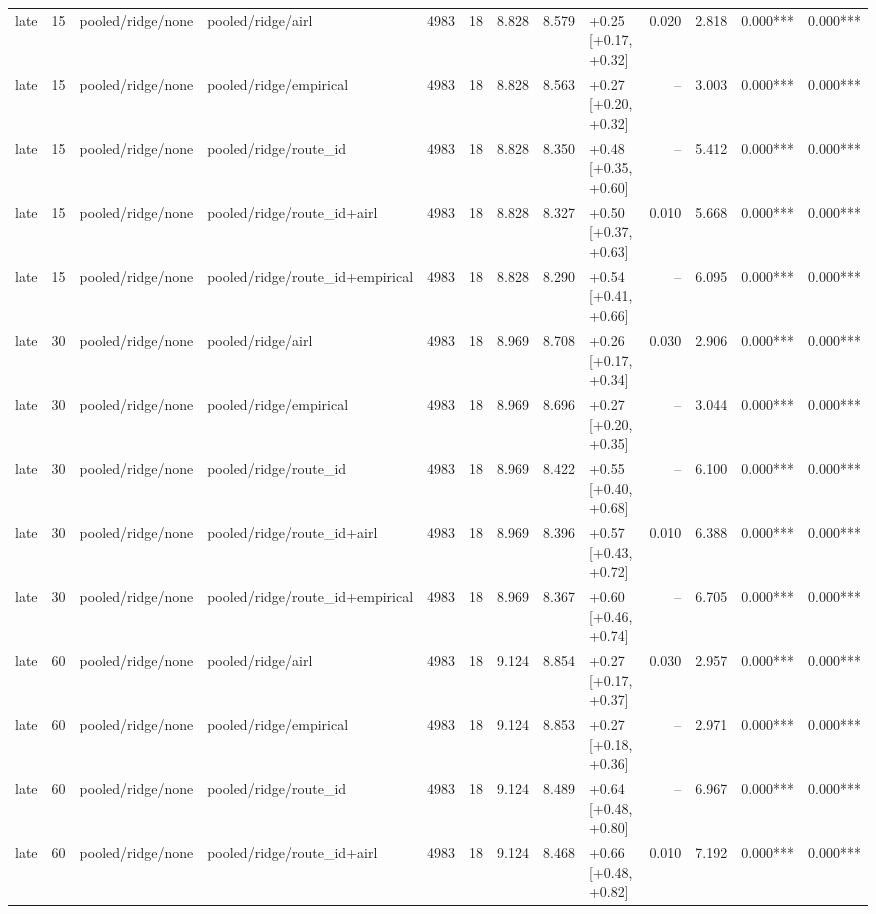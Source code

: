 \begin{tabular}{lrllrrrrlrrll}
late & 15 & pooled/ridge/none & pooled/ridge/airl & 4983 & 18 & 8.828 & 8.579 & +0.25 [+0.17, +0.32] & 0.020 & 2.818 & 0.000*** & 0.000*** \\
late & 15 & pooled/ridge/none & pooled/ridge/empirical & 4983 & 18 & 8.828 & 8.563 & +0.27 [+0.20, +0.32] & -- & 3.003 & 0.000*** & 0.000*** \\
late & 15 & pooled/ridge/none & pooled/ridge/route_id & 4983 & 18 & 8.828 & 8.350 & +0.48 [+0.35, +0.60] & -- & 5.412 & 0.000*** & 0.000*** \\
late & 15 & pooled/ridge/none & pooled/ridge/route_id+airl & 4983 & 18 & 8.828 & 8.327 & +0.50 [+0.37, +0.63] & 0.010 & 5.668 & 0.000*** & 0.000*** \\
late & 15 & pooled/ridge/none & pooled/ridge/route_id+empirical & 4983 & 18 & 8.828 & 8.290 & +0.54 [+0.41, +0.66] & -- & 6.095 & 0.000*** & 0.000*** \\
late & 30 & pooled/ridge/none & pooled/ridge/airl & 4983 & 18 & 8.969 & 8.708 & +0.26 [+0.17, +0.34] & 0.030 & 2.906 & 0.000*** & 0.000*** \\
late & 30 & pooled/ridge/none & pooled/ridge/empirical & 4983 & 18 & 8.969 & 8.696 & +0.27 [+0.20, +0.35] & -- & 3.044 & 0.000*** & 0.000*** \\
late & 30 & pooled/ridge/none & pooled/ridge/route_id & 4983 & 18 & 8.969 & 8.422 & +0.55 [+0.40, +0.68] & -- & 6.100 & 0.000*** & 0.000*** \\
late & 30 & pooled/ridge/none & pooled/ridge/route_id+airl & 4983 & 18 & 8.969 & 8.396 & +0.57 [+0.43, +0.72] & 0.010 & 6.388 & 0.000*** & 0.000*** \\
late & 30 & pooled/ridge/none & pooled/ridge/route_id+empirical & 4983 & 18 & 8.969 & 8.367 & +0.60 [+0.46, +0.74] & -- & 6.705 & 0.000*** & 0.000*** \\
late & 60 & pooled/ridge/none & pooled/ridge/airl & 4983 & 18 & 9.124 & 8.854 & +0.27 [+0.17, +0.37] & 0.030 & 2.957 & 0.000*** & 0.000*** \\
late & 60 & pooled/ridge/none & pooled/ridge/empirical & 4983 & 18 & 9.124 & 8.853 & +0.27 [+0.18, +0.36] & -- & 2.971 & 0.000*** & 0.000*** \\
late & 60 & pooled/ridge/none & pooled/ridge/route_id & 4983 & 18 & 9.124 & 8.489 & +0.64 [+0.48, +0.80] & -- & 6.967 & 0.000*** & 0.000*** \\
late & 60 & pooled/ridge/none & pooled/ridge/route_id+airl & 4983 & 18 & 9.124 & 8.468 & +0.66 [+0.48, +0.82] & 0.010 & 7.192 & 0.000*** & 0.000*** \\

\end{tabular}
